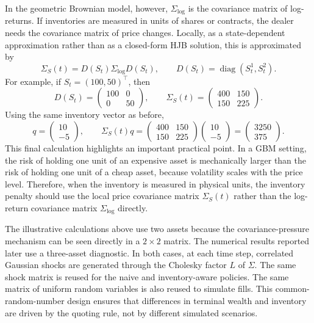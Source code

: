 In the geometric Brownian model, however, $\Sigma_{\log}$ is the covariance matrix of log-returns. If inventories are measured in units of shares or contracts, the dealer needs the covariance matrix of price changes. Locally, as a state-dependent approximation rather than as a closed-form HJB solution, this is approximated by
\[
\Sigma_S(t)
=
D(S_t)\Sigma_{\log}D(S_t),
\qquad
D(S_t)=\operatorname{diag}(S_t^1,S_t^2).
\]
For example, if $S_t=(100,50)^\top$, then
\[
D(S_t)=
\begin{pmatrix}
100 & 0\\
0 & 50
\end{pmatrix},
\qquad
\Sigma_S(t)
=
\begin{pmatrix}
400 & 150\\
150 & 225
\end{pmatrix}.
\]
Using the same inventory vector as before,
\[
q=
\begin{pmatrix}
10\\
-5
\end{pmatrix},
\qquad
\Sigma_S(t)q
=
\begin{pmatrix}
400 & 150\\
150 & 225
\end{pmatrix}
\begin{pmatrix}
10\\
-5
\end{pmatrix}
=
\begin{pmatrix}
3250\\
375
\end{pmatrix}.
\]
This final calculation highlights an important practical point. In a GBM setting, the risk of holding one unit of an expensive asset is mechanically larger than the risk of holding one unit of a cheap asset, because volatility scales with the price level. Therefore, when the inventory is measured in physical units, the inventory penalty should use the local price covariance matrix $\Sigma_S(t)$ rather than the log-return covariance matrix $\Sigma_{\log}$ directly.

The illustrative calculations above use two assets because the covariance-pressure mechanism can be seen directly in a $2\times 2$ matrix. The numerical results reported later use a three-asset diagnostic. In both cases, at each time step, correlated Gaussian shocks are generated through the Cholesky factor $L$ of $\Sigma$. The same shock matrix is reused for the naive and inventory-aware policies. The same matrix of uniform random variables is also reused to simulate fills. This common-random-number design ensures that differences in terminal wealth and inventory are driven by the quoting rule, not by different simulated scenarios.

